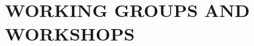 \documentclass[11pt,english]{article}
\begin{document}

\vspace{-2ex}
\section*{WORKING GROUPS AND WORKSHOPS} %
\vspace{-0.5ex}
\end{document}
